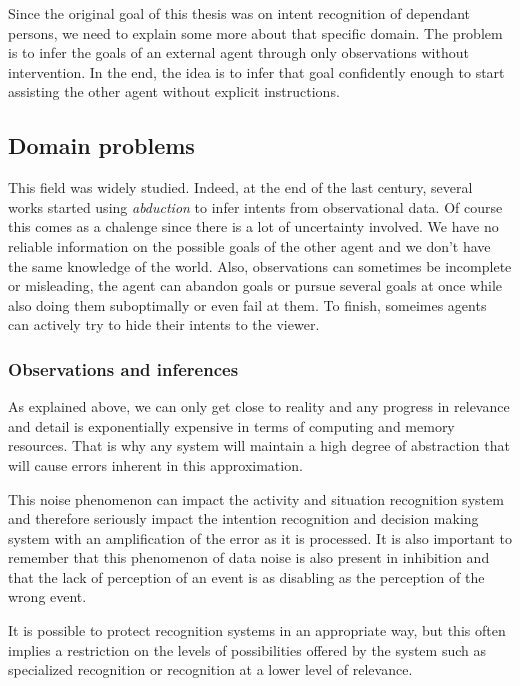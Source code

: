 \documentclass[11pt,a4paper,twoside,openright,titlepage,numbers=noenddot,headinclude,cleardoublepage=empty,openany]{scrreprt}
\theoremstyle{plain}
\theoremstyle{definition}
\theoremstyle{remark}
\begin{document}
Since the original goal of this thesis was on intent recognition of
dependant persons, we need to explain some more about that specific
domain. The problem is to infer the goals of an external agent through
only observations without intervention. In the end, the idea is to infer
that goal confidently enough to start assisting the other agent without
explicit instructions.

\hypertarget{domain-problems}{%
\subsection{Domain problems}\label{domain-problems}}

This field was widely studied. Indeed, at the end of the last century,
several works started using \emph{abduction} to infer intents from
observational data. Of course this comes as a chalenge since there is a
lot of uncertainty involved. We have no reliable information on the
possible goals of the other agent and we don't have the same knowledge
of the world. Also, observations can sometimes be incomplete or
misleading, the agent can abandon goals or pursue several goals at once
while also doing them suboptimally or even fail at them. To finish,
someimes agents can actively try to hide their intents to the viewer.

\hypertarget{observations-and-inferences}{%
\subsubsection{Observations and
inferences}\label{observations-and-inferences}}

As explained above, we can only get close to reality and any progress in
relevance and detail is exponentially expensive in terms of computing
and memory resources. That is why any system will maintain a high degree
of abstraction that will cause errors inherent in this approximation.

This noise phenomenon can impact the activity and situation recognition
system and therefore seriously impact the intention recognition and
decision making system with an amplification of the error as it is
processed. It is also important to remember that this phenomenon of data
noise is also present in inhibition and that the lack of perception of
an event is as disabling as the perception of the wrong event.

It is possible to protect recognition systems in an appropriate way, but
this often implies a restriction on the levels of possibilities offered
by the system such as specialized recognition or recognition at a lower
level of relevance.
\end{document}
